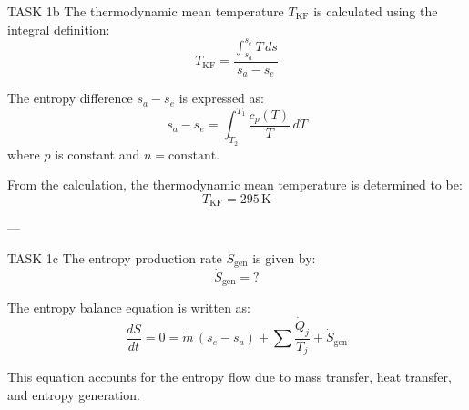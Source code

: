 TASK 1b  
The thermodynamic mean temperature \( T_{\text{KF}} \) is calculated using the integral definition:  
\[
T_{\text{KF}} = \frac{\int_{s_a}^{s_e} T \, ds}{s_a - s_e}
\]  

The entropy difference \( s_a - s_e \) is expressed as:  
\[
s_a - s_e = \int_{T_2}^{T_1} \frac{c_{p}(T)}{T} \, dT
\]  
where \( p \) is constant and \( n = \text{constant} \).  

From the calculation, the thermodynamic mean temperature is determined to be:  
\[
T_{\text{KF}} = 295 \, \text{K}
\]  

---

TASK 1c  
The entropy production rate \( \dot{S}_{\text{gen}} \) is given by:  
\[
\dot{S}_{\text{gen}} = ?
\]  

The entropy balance equation is written as:  
\[
\frac{dS}{dt} = 0 = \dot{m} \, (s_e - s_a) + \sum \frac{\dot{Q}_j}{T_j} + \dot{S}_{\text{gen}}
\]  

This equation accounts for the entropy flow due to mass transfer, heat transfer, and entropy generation.